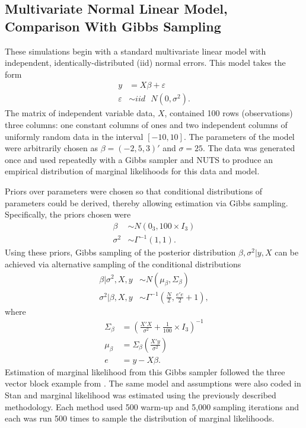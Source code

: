 \documentclass[twocolumn]{article}
\newcommand{\ep}{\varepsilon}
\begin{document}
\subsection{Multivariate Normal Linear Model, Comparison With Gibbs Sampling}



These simulations begin with a standard multivariate linear model with independent, identically-distributed (iid) normal errors. This model takes the form
\begin{subequations}
\begin{align}
	y &= X\beta + \ep \\
	\ep &\sim iid \mbox{ }N(0, \sigma^2). 
\end{align}
\end{subequations}
The matrix of independent variable data, $X$, contained 100 rows (observations) three columns: one constant columns of ones and two independent columns of uniformly random data in the interval $[-10, 10]$. The parameters of the model were arbitrarily chosen as $\beta = (-2, 5, 3)'$ and $\sigma = 25$. The data was generated once and used repeatedly with a Gibbs sampler and NUTS to produce an empirical distribution of marginal likelihoods for this data and model.

Priors over parameters were chosen so that conditional distributions of parameters could be derived, thereby allowing estimation via Gibbs sampling. Specifically, the priors chosen were
\begin{subequations}
\begin{align}
	\beta &\sim N(0_3, 100\times I_3)\\
	\sigma^2 &\sim \Gamma^{-1}(1, 1).
\end{align}
\end{subequations}
Using these priors, Gibbs sampling of the posterior distribution $\beta, \sigma^2|y, X$ can be achieved via alternative sampling of the conditional distributions
\begin{subequations}
\begin{align}
	\beta|\sigma^2, X, y &\sim N(\mu_\beta, \Sigma_\beta) \\
	\sigma^2|\beta, X, y &\sim \Gamma^{-1}\left(\frac{N}2, \frac{e'e}2 + 1\right),
\end{align}
\end{subequations}
where
\begin{subequations}
\begin{align}
	\Sigma_\beta &= \left(\frac{X'X}{\sigma^2} + \frac1{100}\times I_3\right)^{-1}\\
	\mu_\beta &= \Sigma_\beta\left(\frac{X'y}{\sigma^2}\right)\\
	e &= y - X\beta.
\end{align}
\end{subequations}
Estimation of marginal likelihood from this Gibbs sampler followed the three vector block example from \cite{Chib}. The same model and assumptions were also coded in Stan and marginal likelihood was estimated using the previously described methodology. Each method used 500 warm-up and 5,000 sampling iterations and each was run 500 times to sample the distribution of marginal likelihoods.
\end{document}
